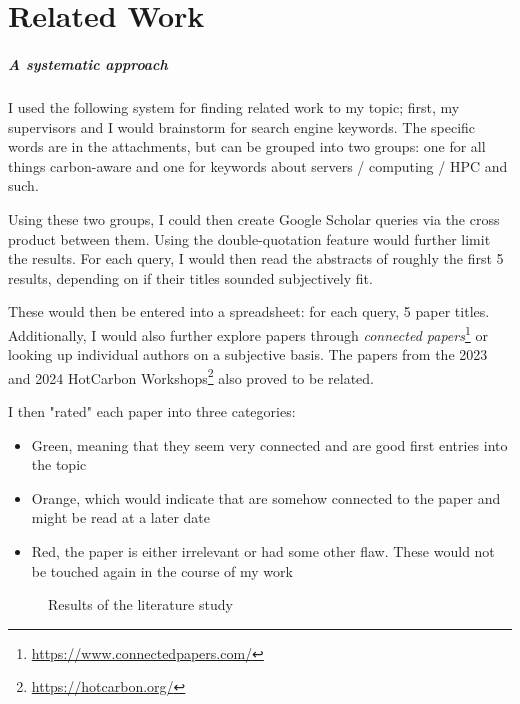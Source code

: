 \chapter{Related Work}

\paragraph{A systematic approach}

I used the following system for finding related work to my topic; 
first, my supervisors and I would brainstorm for search engine keywords. 
The specific words are in the attachments, but can be grouped into two groups: one for all things carbon-aware and one for keywords about servers / computing / HPC and such.

Using these two groups, I could then create Google Scholar queries via the cross product between them. 
Using the double-quotation feature would further limit the results.
For each query, I would then read the abstracts of roughly the first 5 results, depending on if their titles sounded subjectively fit. 

These would then be entered into a spreadsheet: for each query, 5 paper titles. Additionally, I would also further explore papers through \emph{connected papers}\footnote{\url{https://www.connectedpapers.com/}} or looking up individual authors on a subjective basis. 
The papers from the 2023 and 2024 HotCarbon Workshops\footnote{\url{https://hotcarbon.org/}} also proved to be related.

I then "rated" each paper into three categories:

\begin{itemize}
    \item Green, meaning that they seem very connected and are good first entries into the topic
    \item Orange, which would indicate that are somehow connected to the paper and might be read at a later date
    \item Red, the paper is either irrelevant or had some other flaw. These would not be touched again in the course of my work
\end{itemize}

\begin{figure}
    \caption[short]{Results of the literature study}
    \label{fig:literature_study}
\end{figure}


